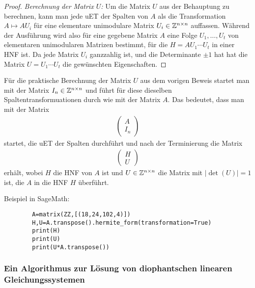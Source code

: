 \begin{proof}
		\emph{Berechnung der Matrix $U$:} Um die Matrix $U$ aus der Behauptung zu berechnen, kann man jede uET der Spalten von $A$ als die Transformation $A \mapsto A U_i$ für eine elementare unimodulare Matrix $U_i \in \mathbb Z^{n \times n}$ auffassen. Während der Ausführung wird also für eine gegebene Matrix $A$ eine Folge $U_1,\ldots,U_t$ von elementaren unimodularen Matrizen bestimmt, für die $H = A U_1 \cdots U_t$ in einer HNF ist. Da jede Matrix $U_i$ ganzzahlig ist, und die Determinante $\pm 1$ hat hat die Matrix $U = U_1 \cdots U_t$ die gewünschten Eigenschaften. 
	\end{proof} 
	
	\begin{bem} 
		Für die praktische Berechnung der Matrix $U$ aus dem vorigen Beweis startet man mit der Matrix $I_n \in \mathbb Z^{n \times n}$ und führt für diese dieselben Spaltentransformuationen durch wie mit der Matrix $A$. Das bedeutet, dass man mit der Matrix 
		\begin{align*}
			\begin{pmatrix} 
				A \\ I_n
			\end{pmatrix} 
		\end{align*} 
		startet, die uET der Spalten durchführt und nach der Terminierung die Matrix 
		\begin{align*}
			\begin{pmatrix*} 
				H \\ U
			\end{pmatrix*} 
		\end{align*} 
		erhält, wobei $H$ die HNF von $A$ ist und $U \in \mathbb Z^{n \times n}$ die Matrix mit $|\det(U)|=1$ ist, die $A$ in die HNF $H$ überführt. 
	\end{bem} 
	
	Beispiel in SageMath: 
	\begin{verbatim}
		A=matrix(ZZ,[(18,24,102,4)])
		H,U=A.transpose().hermite_form(transformation=True)
		print(H)
		print(U)
		print(U*A.transpose())
	\end{verbatim}
	
	
	\subsubsection{Ein Algorithmus zur Lösung von diophantschen linearen Gleichungssystemen} 
	
